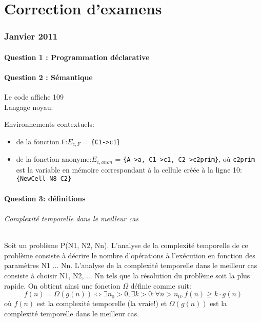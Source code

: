 \newpage
\part*{Correction d'examens}
\section*{Janvier 2011}
\subsection*{Question 1 : Programmation déclarative}


\subsection*{Question 2 : Sémantique}

Le code affiche 109\\
Langage noyau:

Environnements contextuels:
\begin{itemize}
\item de la fonction \lstinline|F|:$E_{c,F}$ = \lstinline|{C1->c1}| 
\item de la fonction anonyme:$E_{c,anon}$ = 
\lstinline|{A->a, C1->c1, C2->c2prim}|, où \lstinline|c2prim| est la variable en mémoire correspondant à la cellule créée à la ligne 10: \lstinline|{NewCell N8 C2}|

\end{itemize}

\subsection*{Question 3: définitions}

\paragraph{Complexité temporelle dans le meilleur cas}
Soit un problème P(N1, N2, Nn). L'analyse de la complexité temporelle de ce problème consiste à décrire le nombre d'opérations à l'exécution en fonction des paramètres N1 ... Nn.
L'analyse de la complexité temporelle dans le meilleur cas consiste à choisir N1, N2, ... Nn tels que la résolution du problème soit la plus rapide. On obtient ainsi une fonction $\Omega$ définie comme suit:
$$ f(n)=\Omega(g(n)) \Leftrightarrow \exists n_0 > 0, \exists k>0: \forall n>n_0, f(n) \geq k\cdot g(n) $$
où $f(n)$ est la complexité temporelle (la vraie!)
et $\Omega(g(n))$ est la complexité temporelle dans le meilleur cas.

